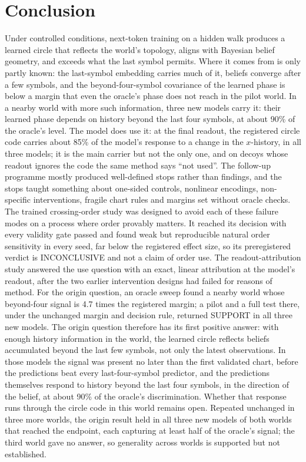 \documentclass[11pt,a4paper]{article}
\DeclareRobustCommand{\_}{\ifmmode\origunderscore\else\textunderscore\allowbreak\fi}
\begin{document}
\section{Conclusion}\label{sec:conclusion}
Under controlled conditions, next-token training on a hidden walk produces a learned circle that
reflects the world's topology, aligns with Bayesian belief geometry, and exceeds what the last
symbol permits. Where it comes from is only partly known: the last-symbol embedding carries much of
it, beliefs converge after a few symbols, and the beyond-four-symbol covariance of the learned phase
is below a margin that even the oracle's phase does not reach in the pilot world. In a nearby
world with more such information, three new models carry it: their learned phase depends on
history beyond the last four symbols, at about 90\% of the oracle's level. The model does use it: at the
final readout, the registered circle code carries about 85\% of the model's response to a change
in the $x$-history, in all three models; it is the main carrier but not the only one, and on
decoys whose readout ignores the code the same method says ``not used''. The follow-up programme mostly produced well-defined stops rather than findings, and the
stops taught something about one-sided controls, nonlinear encodings, non-specific interventions,
fragile chart rules and margins set without oracle checks. The trained crossing-order study was
designed to avoid each of these failure modes on a process where order provably matters. It
reached its decision with every validity gate passed and found weak but reproducible natural
order sensitivity in every seed, far below the registered effect size, so its preregistered
verdict is INCONCLUSIVE and not a claim of order use. The readout-attribution study answered
the use question with an exact, linear attribution at the model's readout, after the two
earlier intervention designs had failed for reasons of method. For the origin question, an oracle
sweep found a nearby world whose beyond-four signal is 4.7 times the registered margin; a pilot
and a full test there, under the unchanged margin and decision rule, returned SUPPORT in all
three new models. The origin question therefore has its first positive answer: with enough
history information in the world, the learned circle reflects beliefs accumulated beyond the last
few symbols, not only the latest observations. In those models the signal was present no later
than the first validated chart, before the predictions beat every last-four-symbol predictor, and
the predictions themselves respond to history beyond the last four symbols, in the direction of the
belief, at about 90\% of the oracle's discrimination. Whether that response runs through the
circle code in this world remains open. Repeated unchanged in three more worlds, the origin result
held in all three new models of both worlds that reached the endpoint, each capturing at least half
of the oracle's signal; the third world gave no answer, so generality across worlds is supported
but not established.
\end{document}
